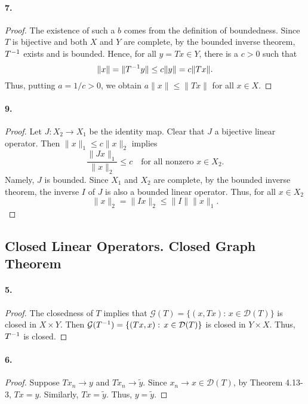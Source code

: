   \paragraph{7.}
  \begin{proof}
    The existence of such a $b$ comes from the definition of boundedness. Since 
    $T$ is bijective and both $X$ and $Y$ are complete, by the bounded inverse
    theorem, $T^{-1}$ exists and is bounded. Hence, for all $y=Tx\in Y$, there is
    a $c>0$ such that
    \[
      \|x\|=\|T^{-1} y\|\le c\|y\|=c\|Tx\|.
    \]
    Thus, putting $a=1/c>0$, we obtain $a\|x\|\le\|Tx\|$ for all $x\in X$.
  \end{proof}
  
  \paragraph{9.}
  \begin{proof}
    Let $J:X_2\to X_1$ be the identity map. Clear that $J$ a bijective linear
    operator. Then $\|x\|_1\le c\|x\|_2$ implies
    \[
      \frac{\|Jx\|_1}{\|x\|_2}\le c\quad\text{for all nonzero $x\in X_2$}.
    \]
    Namely, $J$ is bounded. Since $X_1$ and $X_2$ are complete, by the bounded
    inverse theorem, the inverse $I$ of $J$ is also a bounded linear operator.
    Thus, for all $x\in X_2$
    \[
      \|x\|_2=\|Ix\|_2\le \|I\|\|x\|_1.
    \]
  \end{proof}
\subsection{Closed Linear Operators. Closed Graph Theorem}
  \paragraph{5.}
  \begin{proof}
    The closedness of $T$ implies that $\mathcal{G}(T)=\{(x,Tx):\,x\in
    \mathcal{D}(T)\}$ is closed in $X\times Y$. Then $\mathcal{G}(T^{-1})=\{(Tx,
    x):\,x\in\mathcal{D}(T)\}$ is closed in $Y\times X$. Thus, $T^{-1}$ is 
    closed.
  \end{proof}
  
  \paragraph{6.}
  \begin{proof}
    Suppose $Tx_n\to y$ and $T\tilde{x}_n\to\tilde{y}$. Since $x_n\to x\in
    \mathcal{D}(T)$, by Theorem 4.13-3, $Tx=y$. Similarly, $Tx=\tilde{y}$. Thus,
    $y=\tilde{y}$.
  \end{proof}
  
